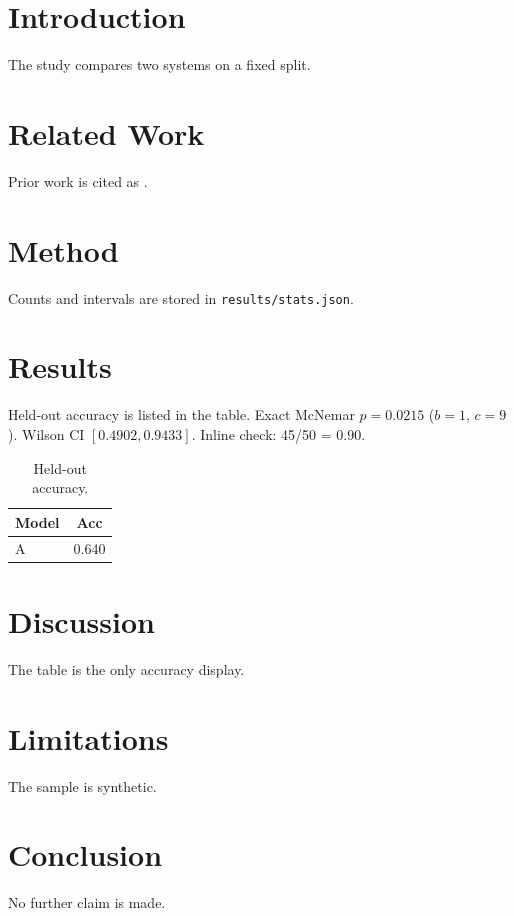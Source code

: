 \documentclass{article}
\begin{document}
\begin{abstract}
Synthetic submission used only as a mechanical-check fixture.
\end{abstract}
\section{Introduction}
The study compares two systems on a fixed split.
\section{Related Work}
Prior work is cited as \cite{vaswani2017}.
\section{Method}
Counts and intervals are stored in \texttt{results/stats.json}.

\section{Results}
Held-out accuracy is listed in the table.
Exact McNemar $p=0.0215$ ($b=1$, $c=9$).
Wilson CI $[0.4902, 0.9433]$.
Inline check: 45/50 = 0.90.

\begin{table}
\caption{Held-out accuracy.}
\label{tab:acc}
\begin{tabular}{lc}
\toprule
Model & Acc \\
\midrule
A & 0.640 \\
\bottomrule
\end{tabular}
\end{table}
\section{Discussion}
The table is the only accuracy display.
\section{Limitations}
The sample is synthetic.
\section{Conclusion}
No further claim is made.
\end{document}

